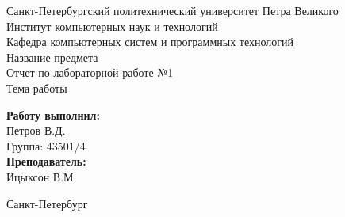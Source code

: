 \begin{titlepage}	%

	\begin{center}		%

		\large Санкт-Петербургский политехнический университет Петра Великого\\
		\large Институт компьютерных наук и технологий \\
		\large Кафедра компьютерных систем и программных технологий\\[6cm]
		
		\huge Название предмета\\[0.5cm] %
		\large Отчет по лабораторной работе №1\\[0.1cm]
		\large Тема работы\\[5cm]

	\end{center}


	\begin{flushright} %
		\begin{minipage}{0.25\textwidth} %
			\begin{flushleft} %

				\large\textbf{Работу выполнил:}\\
				\large Петров В.Д.\\
				\large {Группа:} 43501/4\\
				
				\large \textbf{Преподаватель:}\\
				\large Ицыксон В.М.

			\end{flushleft}
		\end{minipage}
	\end{flushright}
	
	\vfill %

	\begin{center}
	\large Санкт-Петербург\\
	\large \the\year %
	\end{center} %

\end{titlepage} %

\vfill %
